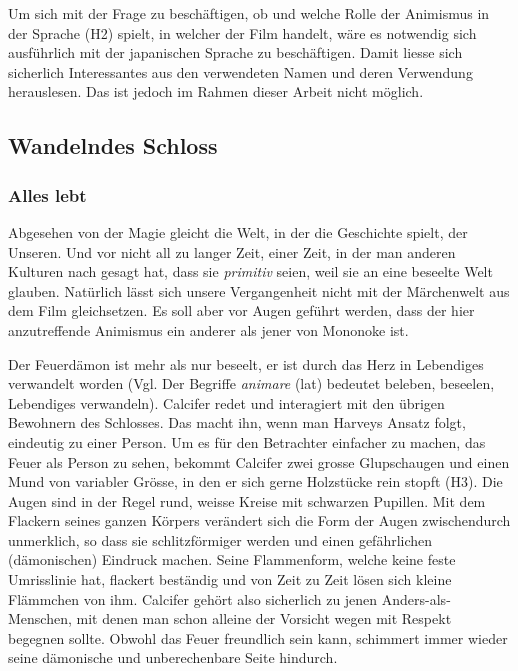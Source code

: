 Um sich mit der Frage zu beschäftigen, ob und welche Rolle der Animismus in der Sprache (H2) spielt, in welcher der Film handelt, wäre es notwendig sich ausführlich mit der japanischen Sprache zu beschäftigen. Damit liesse sich sicherlich Interessantes aus den verwendeten Namen und deren Verwendung herauslesen. Das ist jedoch im Rahmen dieser Arbeit nicht möglich. 

\subsection{Wandelndes Schloss} 
\subsubsection{Alles lebt} 
Abgesehen von der Magie gleicht die Welt, in der die Geschichte spielt, der Unseren. Und vor nicht all zu langer Zeit, einer Zeit, in der man anderen Kulturen nach gesagt hat, dass sie \emph{primitiv} seien, weil sie an eine beseelte Welt glauben. Natürlich lässt sich unsere Vergangenheit nicht mit der Märchenwelt aus dem Film gleichsetzen. Es soll aber vor Augen geführt werden, dass der hier anzutreffende Animismus ein anderer als jener von Mononoke ist. 

Der Feuerdämon ist mehr als nur beseelt, er ist durch das Herz in Lebendiges verwandelt worden (Vgl. Der Begriffe \emph{animare} (lat) bedeutet beleben, beseelen, Lebendiges verwandeln). Calcifer redet und interagiert mit den übrigen Bewohnern des Schlosses. Das macht ihn, wenn man Harveys Ansatz folgt, eindeutig zu einer Person. Um es für den Betrachter einfacher zu machen, das Feuer als Person zu sehen, bekommt Calcifer zwei grosse Glupschaugen und einen Mund von variabler Grösse, in den er sich gerne Holzstücke rein stopft (H3). Die Augen sind in der Regel rund, weisse Kreise mit schwarzen Pupillen. Mit dem Flackern seines ganzen Körpers verändert sich die Form der Augen zwischendurch unmerklich, so dass sie schlitzförmiger werden und einen gefährlichen (dämonischen) Eindruck machen. Seine Flammenform, welche keine feste Umrisslinie hat, flackert beständig und von Zeit zu Zeit lösen sich kleine Flämmchen von ihm. Calcifer gehört also sicherlich zu jenen Anders-als-Menschen, mit \mbox{denen} man schon alleine der Vorsicht wegen mit Respekt begegnen sollte. Obwohl das Feuer freundlich sein kann, schimmert immer wieder seine dämonische und unberechenbare Seite hindurch. 

